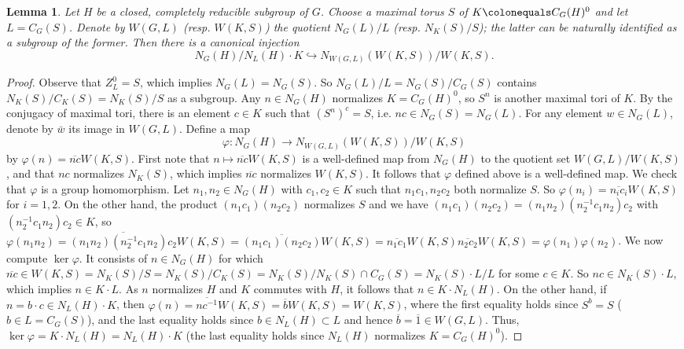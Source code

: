 \documentclass[11pt, letterpaper,english]{amsart}
\theoremstyle{plain}
\newtheorem{lem}{Lemma}
\theoremstyle{definition}
\numberwithin{equation}{section}
\numberwithin{lem}{section}
\DeclareMathOperator{\Ker}{ker}
\newcommand{\cent}[2]{C_{#1}(#2)}
\newcommand{\nlz}[2]{N_{#1}(#2)}
\begin{document}
\begin{lem}\label{lem:injection into weyl groups}
Let $H$ be a closed, completely reducible subgroup of $G$. Choose a maximal torus $S$ of $K \colonequals C_G(H)^0$ and let $L=C_G(S)$. 
Denote by $W(G,L)$ (resp. $W(K,S)$) the quotient $N_G(L)/L$ (resp. $N_{K}(S)/S$); the latter can be naturally identified as a subgroup of the former.
Then there is a canonical injection
$$
N_G(H)/N_L(H)\cdot K \hookrightarrow N_{W(G,L)}(W(K,S))/W(K,S).
$$
\end{lem}
\begin{proof}
Observe that $Z_L^0=S$, which implies $N_G(L)=N_G(S)$. So $N_G(L)/L=\nlz{G}{S}/\cent{G}{S}$ contains $\nlz{K}{S}/\cent{K}{S}=N_{K}(S)/S$ as a subgroup. 
Any $n \in N_G(H)$ normalizes $K=C_G(H)^0$, so $S^n$ is another maximal tori of $K$. By the conjugacy of maximal tori, there is an element $c \in K$ such that $(S^n)^c=S$, i.e. $nc \in N_G(S)=N_G(L)$. For any element $w \in N_G(L)$, denote by $\bar w$ its image in $W(G,L)$. Define a map 
\[
\varphi: N_G(H) \to N_{W(G,L)}(W(K,S))/W(K,S)
\]
by $\varphi(n)=\overline{nc}W(K,S)$. 
First note that $n \mapsto \overline{nc} W(K,S)$ is a well-defined map from $N_{G}(H)$ to the quotient set $W(G,L)/W(K,S)$, and that $nc$ normalizes $\nlz{K}{S}$, which implies $\overline{nc}$ normalizes $W(K,S)$. It follows that $\varphi$ defined above is a well-defined map.
We check that $\varphi$ is a group homomorphism. Let $n_1, n_2 \in N_{G}(H)$ with $c_1, c_2 \in K$ such that $n_1c_1, n_2c_2$ both normalize $S$. So $\varphi(n_i)=\overline{n_ic_i}W(K,S)$ for $i=1,2$. 
On the other hand, the product $(n_1c_1)(n_2c_2)$ normalizes $S$ and we have $(n_1c_1)(n_2c_2)=(n_1n_2)(n_2^{-1}c_1n_2)c_2$ with $(n_2^{-1}c_1n_2)c_2 \in K$, so $\varphi(n_1n_2)=\overline{(n_1n_2)(n_2^{-1}c_1n_2)c_2} W(K,S)=\overline{(n_1c_1)(n_2c_2)}W(K,S)=\overline{n_1c_1}W(K,S)\overline{n_2c_2}W(K,S)=\varphi(n_1)\varphi(n_2)$. 
We now compute $\Ker \varphi$. It consists of $n \in \nlz{G}{H}$ for which 
$\overline{nc} \in W(K,S)=\nlz{K}{S}/S=N_{K}(S)/C_{K}(S)=N_{K}(S)/N_{K}(S) \cap C_{G}(S)=N_{K}(S) \cdot L/L$ for some $c \in K$. So $nc \in N_{K}(S) \cdot L$, which implies $n \in K \cdot L$. As $n$ normalizes $H$ and $K$ commutes with $H$, it follows that $n \in K \cdot \nlz{L}{H}$. On the other hand, if $n=b \cdot c \in \nlz{L}{H} \cdot K$, then $\varphi(n)=\overline{nc^{-1}}W(K,S)=\overline{b} W(K,S)=W(K,S)$, where the first equality holds since $S^{b}=S$ ($b \in L=\cent{G}{S}$), and the last equality holds since $b \in \nlz{L}{H} \subset L$ and hence $\overline b=\overline 1 \in W(G,L)$. Thus, $\Ker \varphi = K \cdot \nlz{L}{H} = \nlz{L}{H} \cdot K$ (the last equality holds since $\nlz{L}{H}$ normalizes $K=\cent{G}{H}^0$). 
\end{proof}
\end{document}
